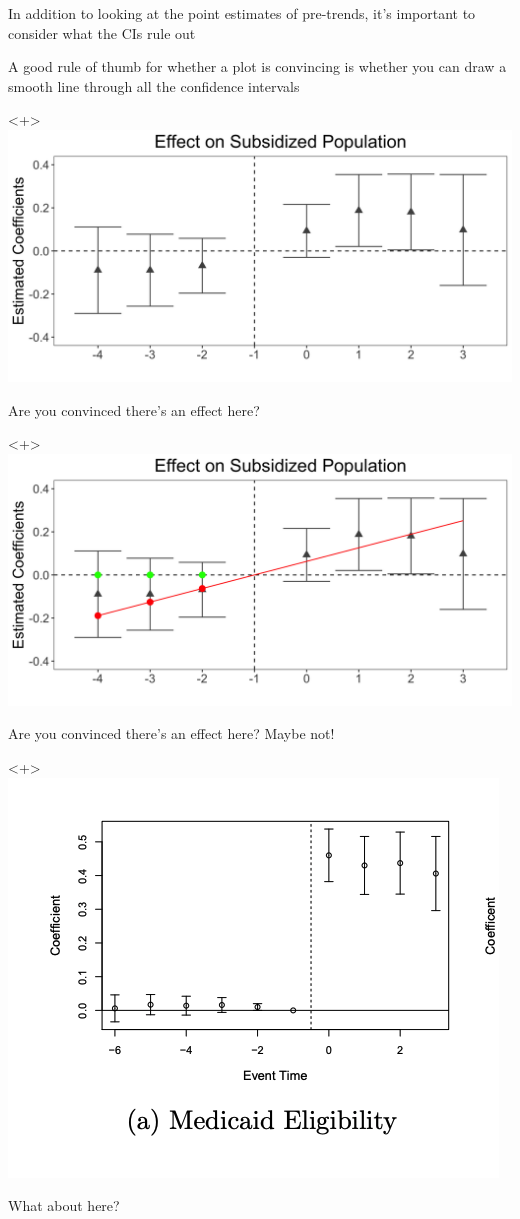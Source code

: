 \documentclass[11pt,english,handout]{beamer}
\newenvironment{wideitemize}{\itemize\addtolength{\itemsep}{10pt}}{\enditemize}
\begin{document}
\begin{frame}
\begin{wideitemize}
	\item
	In addition to looking at the point estimates of pre-trends, it's important to consider what the CIs rule out
	
	\pause
	\item
	A good rule of thumb for whether a plot is convincing is whether you can draw a smooth line through all the confidence intervals
\end{wideitemize}

\pause
\begin{onlyenv}<+>
\centering
\includegraphics[width = 0.7 \linewidth]{HeAndWang-base}
\begin{wideitemize}
	\item
	Are you convinced there's an effect here?
\end{wideitemize}
\end{onlyenv}

\begin{onlyenv}<+>
	\centering
	\includegraphics[width = 0.7 \linewidth]{HeAndWang-RedTrend}
	\begin{wideitemize}
		\item
		Are you convinced there's an effect here? Maybe not!
	\end{wideitemize}
\end{onlyenv}


\begin{onlyenv}<+>
	\centering
	\includegraphics[width = 0.4 \linewidth]{medicaid-eligibility}
	\begin{wideitemize}
		\item
		What about here? 
	\end{wideitemize}
\end{onlyenv}



\end{frame}
\end{document}
